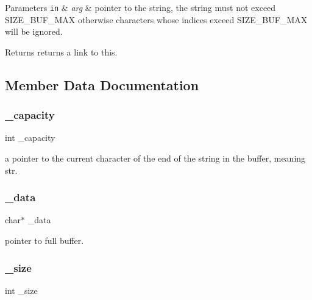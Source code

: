 \begin{DoxyParams}[1]{Parameters}
\mbox{\tt in}  & {\em arg} & pointer to the string, the string must not exceed S\+I\+Z\+E\+\_\+\+B\+U\+F\+\_\+\+M\+AX otherwise characters whose indices exceed S\+I\+Z\+E\+\_\+\+B\+U\+F\+\_\+\+M\+AX will be ignored. \\
\hline
\end{DoxyParams}
\begin{DoxyReturn}{Returns}
returns a link to this. 
\end{DoxyReturn}


\subsection{Member Data Documentation}
\mbox{\label{classmessage_adc9ca8d1d3cf06b3975b6e768a942c61}} 
\subsubsection{\texorpdfstring{\+\_\+capacity}{\_capacity}}
{\footnotesize\ttfamily int \+\_\+capacity\hspace{0.3cm}{\ttfamily [private]}}



a pointer to the current character of the end of the string in the buffer, meaning str. 

\mbox{\label{classmessage_a6d995411bcb21f78e2b123e9449df39c}} 
\subsubsection{\texorpdfstring{\+\_\+data}{\_data}}
{\footnotesize\ttfamily char$\ast$ \+\_\+data}



pointer to full buffer. 

\mbox{\label{classmessage_aaa6c8c862a2c0bc18c802314cc58961d}} 
\subsubsection{\texorpdfstring{\+\_\+size}{\_size}}
{\footnotesize\ttfamily int \+\_\+size}




